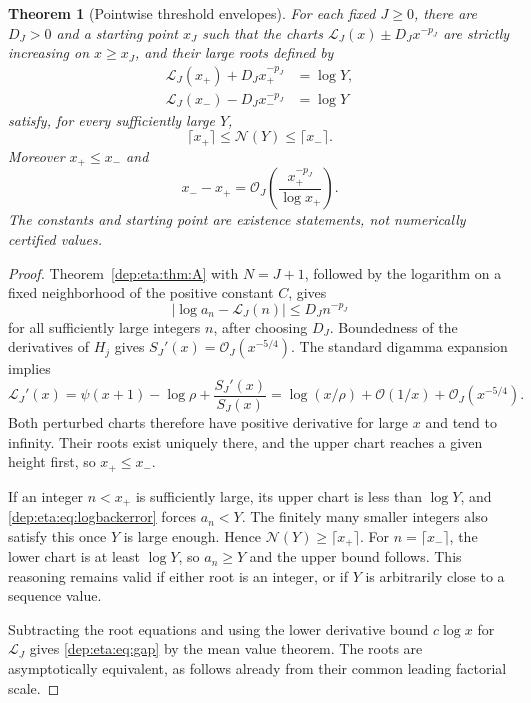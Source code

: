 \documentclass[11pt]{article}
\newtheorem{theorem}{Theorem}[section]
\theoremstyle{definition}\newtheorem{definition}[theorem]{Definition}
\theoremstyle{remark}\newtheorem{remark}[theorem]{Remark}
\newcommand{\OO}{\mathcal O}
\begin{document}
\begin{theorem}[Pointwise threshold envelopes]\label{dep:eta:thm:inverse}
For each fixed $J\ge0$, there are $D_J>0$ and a starting point
$x_J$ such that the charts
$\mathcal L_J(x)\pm D_Jx^{-p_J}$ are strictly increasing on
$x\ge x_J$, and their large roots defined by
\begin{align}
 \mathcal L_J(x_+)+D_Jx_+^{-p_J}&=\log Y,\label{dep:eta:eq:xplus}\\
 \mathcal L_J(x_-)-D_Jx_-^{-p_J}&=\log Y\label{dep:eta:eq:xminus}
\end{align}
satisfy, for every sufficiently large $Y$,
\begin{equation}\label{dep:eta:eq:ceil}
 \lceil x_+\rceil\le\mathcal N(Y)\le\lceil x_-\rceil.
\end{equation}
Moreover $x_+\le x_-$ and
\begin{equation}\label{dep:eta:eq:gap}
 x_--x_+=\OO_J\left(\frac{x_+^{-p_J}}{\log x_+}\right).
\end{equation}
The constants and starting point are existence statements, not
numerically certified values.
\end{theorem}
\begin{proof}
Theorem~\ref{dep:eta:thm:A} with $N=J+1$, followed by the logarithm on a
fixed neighborhood of the positive constant $C$, gives
\begin{equation}\label{dep:eta:eq:logbackerror}
 |\log a_n-\mathcal L_J(n)|\le D_Jn^{-p_J}
\end{equation}
for all sufficiently large integers $n$, after choosing $D_J$.
Boundedness of the derivatives of $H_j$ gives
$S_J'(x)=\OO_J(x^{-5/4})$. The standard digamma expansion implies
\[
 \mathcal L_J'(x)
 =\psi(x+1)-\log\rho+\frac{S_J'(x)}{S_J(x)}
 =\log(x/\rho)+\OO(1/x)+\OO_J(x^{-5/4}).
\]
Both perturbed charts therefore have positive derivative for large
$x$ and tend to infinity. Their roots exist uniquely there, and the
upper chart reaches a given height first, so $x_+\le x_-$.

If an integer $n<x_+$ is sufficiently large, its upper chart is
less than $\log Y$, and \eqref{dep:eta:eq:logbackerror} forces $a_n<Y$.
The finitely many smaller integers also satisfy this once $Y$ is
large enough. Hence $\mathcal N(Y)\ge\lceil x_+\rceil$.
For $n=\lceil x_-\rceil$, the lower chart is at least $\log Y$,
so $a_n\ge Y$ and the upper bound follows. This reasoning remains
valid if either root is an integer, or if $Y$ is arbitrarily close to
a sequence value.

Subtracting the root equations and using the lower derivative bound
$c\log x$ for $\mathcal L_J$ gives \eqref{dep:eta:eq:gap} by the mean value
theorem. The roots are asymptotically equivalent, as follows already
from their common leading factorial scale.
\end{proof}
\end{document}
